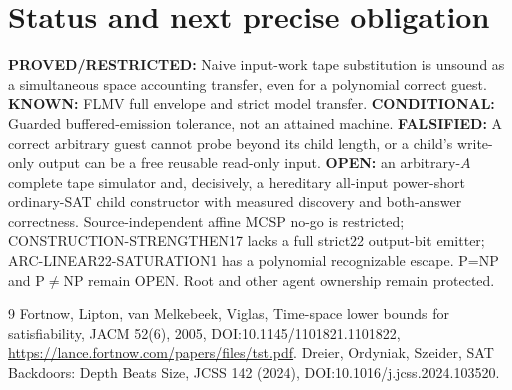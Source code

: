 \documentclass[10pt]{article}
\begin{document}
\section{Status and next precise obligation}
\textbf{PROVED/RESTRICTED:} Naive input-work tape substitution is unsound as a simultaneous space accounting transfer, even for a polynomial correct guest. \textbf{KNOWN:} FLMV full envelope and strict model transfer. \textbf{CONDITIONAL:} Guarded buffered-emission tolerance, not an attained machine. \textbf{FALSIFIED:} A correct arbitrary guest cannot probe beyond its child length, or a child's write-only output can be a free reusable read-only input. \textbf{OPEN:} an arbitrary-$A$ complete tape simulator and, decisively, a hereditary all-input power-short ordinary-SAT child constructor with measured discovery and both-answer correctness. Source-independent affine MCSP no-go is restricted; CONSTRUCTION-STRENGTHEN17 lacks a full strict22 output-bit emitter; ARC-LINEAR22-SATURATION1 has a polynomial recognizable escape. P=NP and P$\ne$NP remain OPEN. Root and other agent ownership remain protected.
\begin{thebibliography}{9}
 Fortnow, Lipton, van Melkebeek, Viglas, Time-space lower bounds for satisfiability, JACM 52(6), 2005, DOI:10.1145/1101821.1101822, \url{https://lance.fortnow.com/papers/files/tst.pdf}.
 Dreier, Ordyniak, Szeider, SAT Backdoors: Depth Beats Size, JCSS 142 (2024), DOI:10.1016/j.jcss.2024.103520.
\end{thebibliography}
\end{document}
